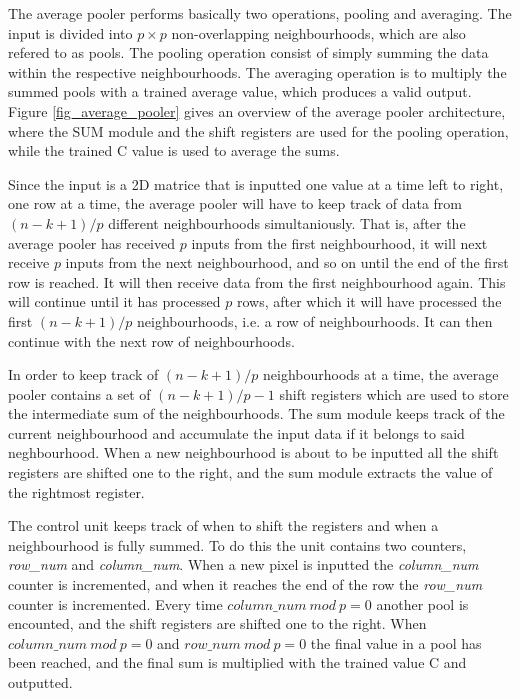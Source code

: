 The average pooler performs basically two operations, pooling and averaging. The input is divided into $ p \times p $ non-overlapping neighbourhoods, which are also refered to as pools. The pooling operation consist of simply summing the data within the respective neighbourhoods. The averaging operation is to multiply the summed pools with a trained average value, which produces a valid output. Figure \ref{fig_average_pooler} gives an overview of the average pooler architecture, where the SUM module and the shift registers are used for the pooling operation, while the trained C value is used to average the sums. 

Since the input is a 2D matrice that is inputted one value at a time left to right, one row at a time, the average pooler will have to keep track of data from $(n-k+1)/p $ different neighbourhoods simultaniously. That is, after the average pooler has received $ p $ inputs from the first neighbourhood, it will next receive $ p $ inputs from the next neighbourhood, and so on until the end of the first row is reached. It will then receive data from the first neighbourhood again. This will continue until it has processed $ p $ rows, after which it will have processed the first $ (n-k+1)/p $ neighbourhoods, i.e. a row of neighbourhoods. It can then continue with the next row of neighbourhoods.

In order to keep track of $ (n-k+1)/p $ neighbourhoods at a time, the average pooler contains a set of $ (n-k+1)/p - 1 $ shift registers which are used to store the intermediate sum of the neighbourhoods. The sum module keeps track of the current neighbourhood and accumulate the input data if it belongs to said neghbourhood. When a new neighbourhood is about to be inputted all the shift registers are shifted one to the right, and the sum module extracts the value of the rightmost register. 

The control unit keeps track of when to shift the registers and when a neighbourhood is fully summed. To do this the unit contains two counters, \textit{row\_num} and \textit{column\_num}. When a new pixel is inputted the \textit{column\_num} counter is incremented, and when it reaches the end of the row the \textit{row\_num} counter is incremented. Every time $ column\_num~mod~p = 0 $ another pool is encounted, and the shift registers are shifted one to the right. When $ column\_num~mod~p = 0 $ and $ row\_num~mod~p = 0 $ the final value in a pool has been reached, and the final sum is multiplied with the trained value C and outputted. 

